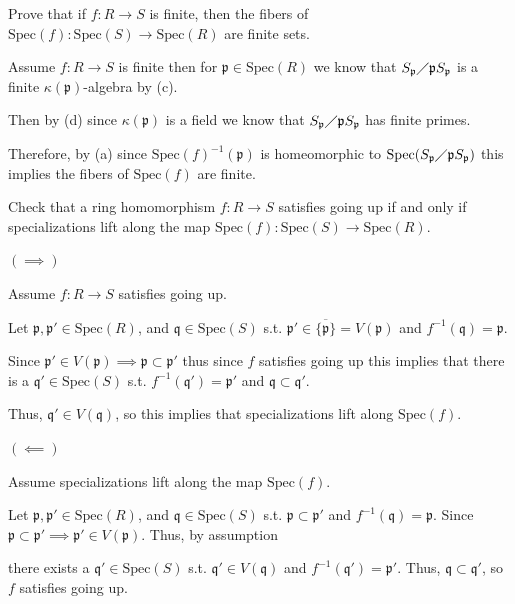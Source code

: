 \documentclass[12pt, letterpaper]{article}
\newcommand{\p}{\mathfrak{p}}
\newcommand{\Spec}{\mathrm{Spec}}
\newcommand{\mf}[1]{\mathfrak{#1}}
\begin{document}
\begin{subproblem}{}
    Prove that if $f : R \to S$ is finite, then the fibers of $\Spec(f) : \Spec(S) \to \Spec(R)$ are
finite sets.
\end{subproblem}
\begin{problemproof}
    Assume $f : R \to S$ is finite then for $\p \in \Spec(R)$ we know that $S_\p \diagup \p S_\p$ is a finite $\kappa(\p)$-algebra by (c).
    
    Then by (d) since $\kappa(\p)$ is a field we know that $S_\p \diagup \p S_\p$ has finite primes.

    Therefore, by (a) since $\Spec(f)^{-1}(\p)$ is homeomorphic to $\Spec(S_\p \diagup \p S_\p)$ this implies the fibers of $\Spec(f)$ are finite.
\end{problemproof}
\setcounter{problemcounter}{1}
\begin{problem}{}
    
\end{problem}
\begin{subproblem}{}
    Check that a ring homomorphism $f : R \to S$ satisfies going up if and only if 
    specializations lift along the map $\Spec(f ) : \Spec(S) \to \Spec(R)$.
\end{subproblem}
\begin{problemproof}
    $(\implies)$

    Assume $f: R \to S$ satisfies going up.

    Let $\p, \p' \in \Spec(R)$, and $\mf{q} \in \Spec(S)$ s.t. $\p' \in \overline{\{\p\}}=V(\p)$ and $f^{-1}(\mf{q})=\p$.

    Since $\p' \in V(\p) \implies \p \subset \p'$ thus since $f$ satisfies going up this implies that there is a $\mf{q}' \in \Spec(S)$ s.t. $f^{-1}(\mf{q}')=\p'$ and $\mf{q} \subset \mf{q}'$.

    Thus, $\mf{q}' \in V(\mf{q})$, so this implies that specializations lift along $\Spec(f)$.

    $(\impliedby)$

    Assume specializations lift along the map $\Spec(f)$.

    Let $\p, \p' \in \Spec(R)$, and $\mf{q} \in \Spec(S)$ s.t. $\p \subset \p'$ and $f^{-1}(\mf{q})=\p$. Since $\p \subset \p' \implies \p' \in V(\p)$. Thus, by assumption
    
    there exists a $\mf{q}' \in \Spec(S)$ s.t. $\mf{q}' \in V(\mf{q})$ and $f^{-1}(\mf{q}')=\p'$. Thus, $\mf{q} \subset \mf{q}'$, so $f$ satisfies going up.
\end{problemproof}
\end{document}
